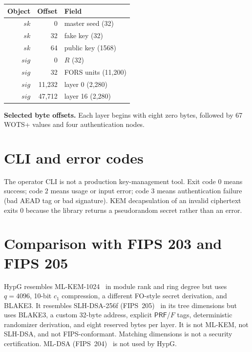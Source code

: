 \documentclass[11pt,a4paper]{article}
\theoremstyle{plain}
\theoremstyle{definition}
\theoremstyle{remark}
\newcommand{\PRF}{\mathsf{PRF}}
\begin{document}
\begin{center}
\small
\begin{tabular}{@{}rrl@{}}
\toprule
Object & Offset & Field \\
\midrule
$sk$ & 0 & master seed (32) \\
$sk$ & 32 & fake key (32) \\
$sk$ & 64 & public key (1568) \\
$sig$ & 0 & $R$ (32) \\
$sig$ & 32 & FORS units (11,200) \\
$sig$ & 11,232 & layer 0 (2,280) \\
$sig$ & 47,712 & layer 16 (2,280) \\
\bottomrule
\end{tabular}
\end{center}
\noindent\textbf{Selected byte offsets.}  Each layer begins with eight
zero bytes, followed by 67 WOTS+ values and four authentication nodes.

\section{CLI and error codes}
\label{app:cli}

The operator CLI is not a production key-management tool.  Exit code
$0$ means success; code $2$ means usage or input error; code $3$ means
authentication failure (bad AEAD tag or bad signature).  KEM
decapsulation of an invalid ciphertext exits $0$ because the library
returns a pseudorandom secret rather than an error.

\section{Comparison with FIPS 203 and FIPS 205}
\label{app:fips}

HypG resembles ML-KEM-1024~\cite{fips203} in module rank and ring
degree but uses $q=4096$, 10-bit $c_1$ compression, a different
FO-style secret derivation, and BLAKE3.  It resembles SLH-DSA-256f
(FIPS~205)~\cite{fips205} in its tree dimensions but uses BLAKE3, a
custom 32-byte address, explicit $\PRF$/$F$ tags, deterministic
randomizer derivation, and eight reserved bytes per layer.  It is not
ML-KEM, not SLH-DSA, and not FIPS-conformant.  Matching dimensions is
not a security certification.  ML-DSA (FIPS~204)~\cite{fips204} is not
used by HypG.
\end{document}
